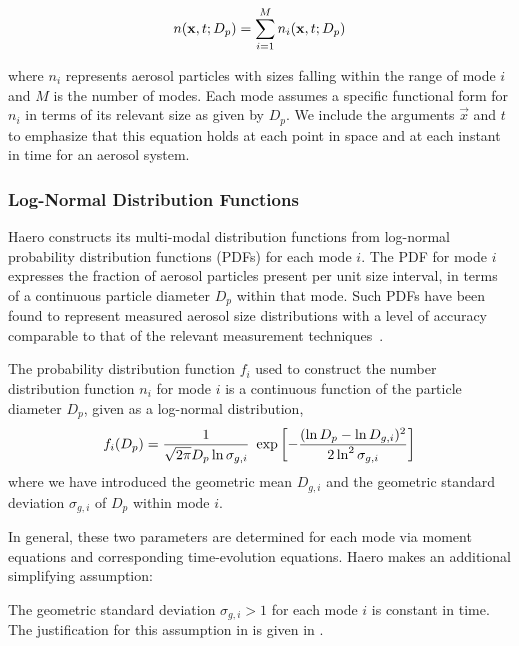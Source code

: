 \begin{equation}\labeleq{modal_n}
  n(\vec{x}, t; D_p) = \sum_{i=1}^M n_i(\vec{x}, t; D_p)
\end{equation}

where $n_i$ represents aerosol particles with sizes falling within the range
of mode $i$ and $M$ is the number of modes. Each mode assumes a specific
functional form for $n_i$ in terms of its relevant size as given by $D_p$.
We include the arguments $\vec{x}$ and $t$ to emphasize that this equation holds
at each point in space and at each instant in time for an aerosol system.

\subsubsection*{Log-Normal Distribution Functions}

Haero constructs its multi-modal distribution functions from log-normal
probability distribution functions (PDFs) for each mode $i$. The PDF for mode
$i$ expresses the fraction of aerosol particles present per unit size interval,
in terms of a continuous particle diameter $D_p$ within that mode. Such PDFs
have been found to represent measured aerosol size distributions with a level of
accuracy comparable to that of the relevant measurement
techniques~\cite{Whitby1991}.

\begin{assume}
The probability distribution function $f_i$ used to construct
        the number distribution function $n_i$ for mode $i$ is a continuous
        function of the particle diameter $D_p$, given as a log-normal distribution,
        \begin{equation}\labeleq{log_normal_pdf}
  f_i(D_p) = \frac{1}{\sqrt{2\pi} D_p \ln \sigma_{g,i}} \ 
      \exp \left [-\frac{(\ln D_p - \ln D_{g,i})^2}{2\ln^2 \sigma_{g,i}} \right]
\end{equation}
where we have introduced the geometric mean $D_{g,i}$ and the geometric standard
deviation $\sigma_{g,i}$ of $D_p$ within mode $i$. 

\end{assume}

In general, these two parameters are determined for each mode via moment equations and corresponding time-evolution equations.
Haero makes an additional simplifying assumption:

\begin{assume}
  The geometric standard deviation $\sigma_{g,i}>1$ for each mode $i$ is constant in time.  
  The justification for this assumption in \cite{Easter2004,Wilson2001,Whitby1991} is given in \cite{Whitby1981}.
\end{assume}


